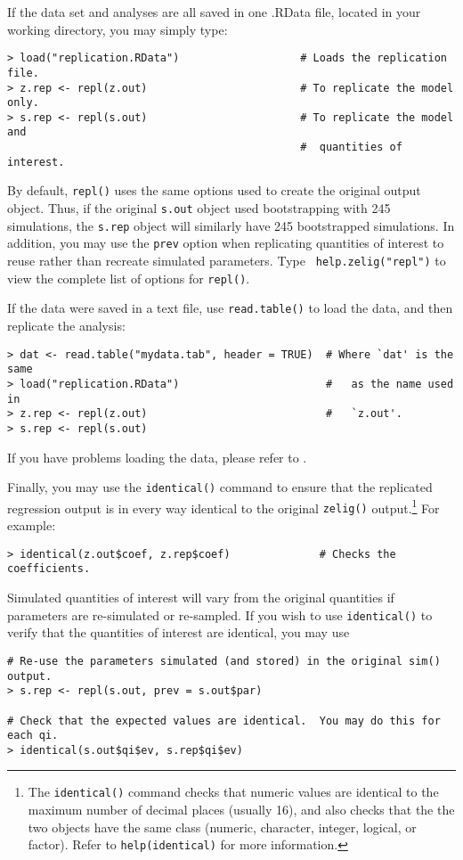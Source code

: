 If the data set and analyses are all saved in one .RData file, located
in your working directory, you may simply type:
\begin{verbatim}
> load("replication.RData")                   # Loads the replication file.  
> z.rep <- repl(z.out)                        # To replicate the model only. 
> s.rep <- repl(s.out)                        # To replicate the model and 
                                              #  quantities of interest.  
\end{verbatim}
By default, {\tt repl()} uses the same options used to create the
original output object.  Thus, if the original {\tt s.out} object used
bootstrapping with 245 simulations, the {\tt s.rep} object will
similarly have 245 bootstrapped simulations.  In addition, you may use
the {\tt prev} option when replicating quantities of interest to reuse
rather than recreate simulated parameters.  Type {\tt
  help.zelig("repl")} to view the complete list of options for
{\tt repl()}.

If the data were saved in a text file, use {\tt read.table()} to load
the data, and then replicate the analysis:
\begin{verbatim}
> dat <- read.table("mydata.tab", header = TRUE)  # Where `dat' is the same
> load("replication.RData")                       #   as the name used in 
> z.rep <- repl(z.out)                            #   `z.out'.
> s.rep <- repl(s.out)  
\end{verbatim}
If you have problems loading the data, please refer to .

Finally, you may use the {\tt identical()} command to ensure that the
replicated regression output is in every way identical to the original
{\tt zelig()} output.\footnote{The {\tt identical()} command checks
  that numeric values are identical to the maximum number of decimal
  places (usually 16), and also checks that the the two objects have
  the same class (numeric, character, integer, logical, or factor).
  Refer to {\tt help(identical)} for more information.}  For example:
\begin{verbatim}
> identical(z.out$coef, z.rep$coef)              # Checks the coefficients.
\end{verbatim}
Simulated quantities of interest will vary from the original
quantities if parameters are re-simulated or re-sampled.  If you wish to
use {\tt identical()} to verify that the quantities of interest are
identical, you may use
\begin{verbatim}
# Re-use the parameters simulated (and stored) in the original sim() output.
> s.rep <- repl(s.out, prev = s.out$par) 

# Check that the expected values are identical.  You may do this for each qi.
> identical(s.out$qi$ev, s.rep$qi$ev) 
\end{verbatim} %



